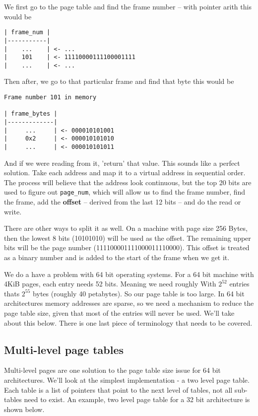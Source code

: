 We first go to the page table and find the frame number -- with pointer arith this would be 

\begin{verbatim}
| frame_num |
|-----------|
|    ...    | <- ...
|    101    | <- 11110000111100001111
|    ...    | <- ...
\end{verbatim}

Then after, we go to that particular frame and find that byte this would be 

\begin{verbatim}
Frame number 101 in memory

| frame_bytes |
|-------------|
|     ...     | <- 000010101001
|     0x2     | <- 000010101010
|     ...     | <- 000010101011
\end{verbatim}

And if we were reading from it, 'return' that value.
This sounds like a perfect solution.
Take each address and map it to a virtual address in sequential order.
The process will believe that the address look continuous, but the top 20 bits are used to figure out \texttt{page\_num},
which will allow us to find the frame number, find the frame, add the \textbf{offset} -- derived from the last 12 bits -- and do the read or write.

There are other ways to split it as well.
On a machine with page size 256 Bytes, then the lowest 8 bits (10101010) will be used as the offset.
The remaining upper bits will be the page number (111100001111000011110000). This offset is treated as a binary number and is added to the start of the frame when we get it.

We do a have a problem with 64 bit operating systems.
For a 64 bit machine with 4KiB pages, each entry needs 52 bits.
Meaning we need roughly
With $2^{52}$ entries thats $2^{55}$ bytes (roughly 40 petabytes).
So our page table is too large.
In 64 bit architectures memory addresses are sparse, so we need a mechanism to reduce the page table size, given that most of the entries will never be used.
We'll take about this below. There is one last piece of terminology that needs to be covered.

\subsection{Multi-level page tables}

Multi-level pages are one solution to the page table size issue for 64 bit architectures.
We'll look at the simplest implementation - a two level page table.
Each table is a list of pointers that point to the next level of tables, not all sub-tables need to exist.
An example, two level page table for a 32 bit architecture is shown below.

